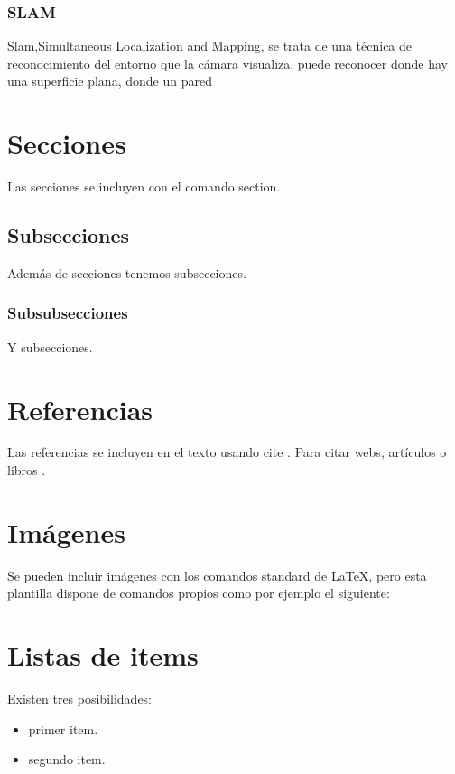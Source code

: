 	\subsubsection{SLAM}
	Slam,Simultaneous Localization and Mapping, se trata de una técnica de reconocimiento del entorno que la cámara visualiza, puede reconocer donde hay una superficie plana, donde un pared
	
	
	
\section{Secciones}

Las secciones se incluyen con el comando section.

\subsection{Subsecciones}

Además de secciones tenemos subsecciones.

\subsubsection{Subsubsecciones}

Y subsecciones. 


\section{Referencias}

Las referencias se incluyen en el texto usando cite \cite{wiki:latex}. Para citar webs, artículos o libros \cite{koza92}.


\section{Imágenes}

Se pueden incluir imágenes con los comandos standard de \LaTeX, pero esta plantilla dispone de comandos propios como por ejemplo el siguiente:




\section{Listas de items}

Existen tres posibilidades:

\begin{itemize}
	\item primer item.
	\item segundo item.
\end{itemize}

